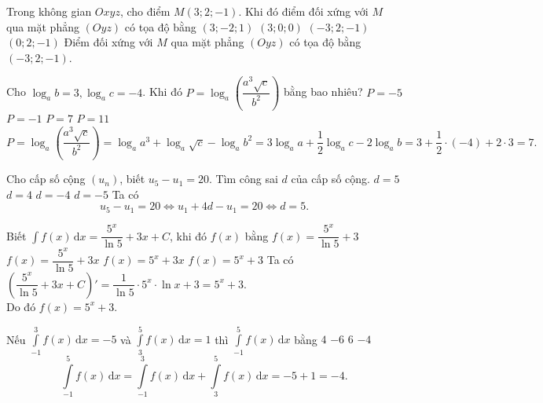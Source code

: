 \begin{ex}%
Trong không gian $Oxyz$, cho điểm $M(3;2;-1)$. Khi đó điểm đối xứng với $M$ qua mặt phẳng $(Oyz)$ có tọa độ bằng
\choice 
{$(3;-2;1)$} 
{$(3;0;0)$}
{\True $(-3;2;-1)$} 
{$(0;2;-1)$}
\loigiai
{
Điểm đối xứng với $M$ qua mặt phẳng $(Oyz)$ có tọa độ bằng $(-3;2;-1)$.
}
\end{ex}

\begin{ex}%
Cho $\log_{a}b=3,\log_{a}c=-4$. Khi đó $P=\log_{a}\left (\dfrac{a^3\sqrt{c}}{b^2} \right )$ bằng bao nhiêu?
\choice 
{$P=-5$} 
{$P=-1$}
{\True $P=7$} 
{$P=11$}
\loigiai
{
$$P=\log_{a}\left (\dfrac{a^3\sqrt{c}}{b^2} \right )=\log_{a}a^3+\log_{a}\sqrt{c}-\log_{a}b^2=3\log_{a}a+\dfrac{1}{2}\log_{a}c-2\log_{a}b=3+\dfrac{1}{2}\cdot (-4)+2\cdot 3=7.$$
}
\end{ex}

\begin{ex}%
Cho cấp số cộng $\left (u_n \right )$, biết $u_5-u_1=20$. Tìm công sai $d$ của cấp số cộng.
\choice 
{\True $d=5$} 
{$d=4$}
{$d=-4$} 
{$d=-5$}
\loigiai
{
Ta có 
$$u_5-u_1=20\Leftrightarrow u_1+4d-u_1=20\Leftrightarrow d=5.$$
}
\end{ex}

\begin{ex}%
Biết $\displaystyle\int f(x)\mathrm{\,d}x=\dfrac{5^x}{\ln 5}+3x+C$, khi đó $f(x)$ bằng
\choice 
{$f(x)=\dfrac{5^x}{\ln 5}+3$} 
{$f(x)=\dfrac{5^x}{\ln 5}+3x$}
{$f(x)=5^x+3x$} 
{\True $f(x)=5^x+3$}
\loigiai
{
Ta có $\left(\dfrac{5^x}{\ln 5}+3x+C\right)'=\dfrac{1}{\ln 5}\cdot 5^x\cdot\ln x+3=5^x+3$.\\
Do đó $f(x)=5^x+3$.
}
\end{ex}

\begin{ex}%
Nếu $\displaystyle\int\limits_{-1}^{3}f(x)\mathrm{\,d}x=-5$ và $\displaystyle\int\limits_{3}^{5}f(x)\mathrm{\,d}x=1$ thì $\displaystyle\int\limits_{-1}^{5}f(x)\mathrm{\,d}x$ bằng
\choice 
{$4$} 
{$-6$}
{$6$} 
{\True $-4$}
\loigiai
{
$$\displaystyle\int\limits_{-1}^{5}f(x)\mathrm{\,d}x=\displaystyle\int\limits_{-1}^{3}f(x)\mathrm{\,d}x+\displaystyle\int\limits_{3}^{5}f(x)\mathrm{\,d}x=-5+1=-4.$$
}
\end{ex}

